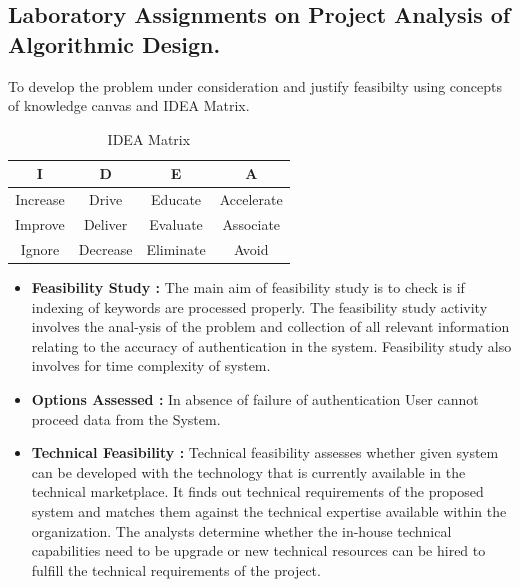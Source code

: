 \documentclass{report} %
\begin{document}
	\begin{appendices}
		
	\chapter{Laboratory Assignments on Project Analysis of Algorithmic Design.}
	\pagebreak
	\vspace*{0.5cm}
		
	To develop the problem under consideration and justify feasibilty using concepts
	of knowledge canvas and IDEA Matrix.
	\vspace*{0.5cm}
	
		\begin{table}[h]
			\centering
			\renewcommand{\arraystretch}{1.5}
			\begin{tabular}{|c|c|c|c|}
				\hline
				\textbf{I} & \textbf{D} & \textbf{E} & \textbf{A} \\
				\hline
				Increase & Drive & Educate & Accelerate \\
				\hline
				Improve & Deliver & Evaluate & Associate \\
				\hline
				Ignore & Decrease & Eliminate & Avoid \\
				\hline
			\end{tabular}
		\caption{IDEA Matrix}
		\end{table}
		
		\begin{itemize}
			\item \textbf{Feasibility Study :} The main aim of feasibility study is to check is if indexing of keywords are processed properly. The feasibility study activity involves the anal-ysis of the problem and collection of all relevant information relating to the accuracy of authentication in the system. Feasibility study also involves for time complexity of system.
			
			\item \textbf{Options Assessed :} In absence of failure of authentication User cannot proceed data from the System.
			
			\item \textbf{Technical Feasibility :} Technical feasibility assesses whether given system can be developed with the technology that is currently available in the technical marketplace. It finds out technical requirements of the proposed system and matches them against the technical expertise available within the
			organization. The analysts determine whether the in-house technical	capabilities need to be upgrade or new technical resources can be hired to fulfill the technical requirements of the project.
			

\end{itemize}
\end{appendices}
\end{document}
